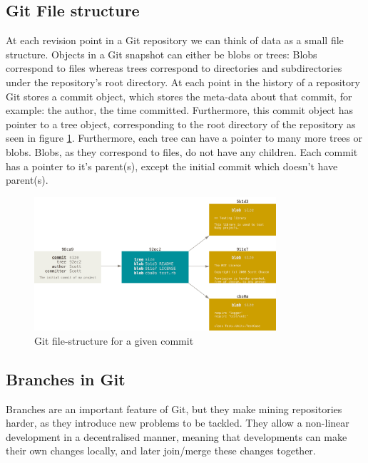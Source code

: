 \documentclass[12pt,twoside,notitlepage]{report}
\begin{document}
\subsection{Git File structure}
At each revision point in a Git repository we can think of data as a small file structure. Objects in a Git snapshot can either be blobs or trees: Blobs correspond to files whereas trees correspond to directories and subdirectories under the repository's root directory. At each point in the history of a repository Git stores a commit object, which stores the meta-data about that commit, for example: the author, the time committed. Furthermore, this commit object has pointer to a tree object, corresponding to the root directory of the repository as seen in figure \ref{commit-and-tree_git}. Furthermore, each tree can have a pointer to many more trees or blobs. Blobs, as they correspond to files, do not have any children. Each commit has a pointer to it's parent(s), except the initial commit which doesn't have parent(s).
\begin{figure}[h]
\includegraphics[width=0.8\textwidth]{commit-and-tree_git.png}
\centering
\caption{Git file-structure for a given commit}
\label{commit-and-tree_git}

\end{figure}
\subsection{Branches in Git}\label{gitbranches}
Branches are an important feature of Git, but they make mining repositories harder, as they introduce new problems to be tackled. They allow a non-linear development in a decentralised manner, meaning that developments can make their own changes locally, and later join/merge these changes together. 
\end{document}
